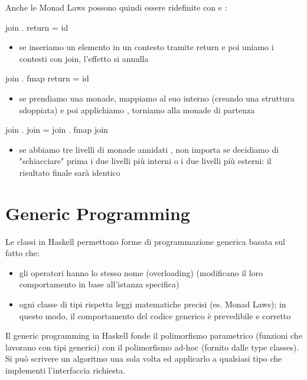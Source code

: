 Anche le Monad Laws possono quindi essere ridefinite con  e :

\begin{haskellbox}{}
join . return = id
\end{haskellbox}
\begin{itemize}
    \item se inseriamo un elemento in un contesto tramite return e poi uniamo i contesti con join, l'effetto si annulla
\end{itemize}

\begin{haskellbox}{}
join . fmap return = id
\end{haskellbox}

\begin{itemize}
    \item se prendiamo una monade, mappiamo  al suo interno (creando una struttura sdoppiata) e poi applichiamo , torniamo alla monade di partenza
\end{itemize}

\begin{haskellbox}{}
join . join = join . fmap join
\end{haskellbox}
\begin{itemize}
    \item se abbiamo tre livelli di monade annidati , non importa se decidiamo di "schiacciare" prima i due livelli più interni o i due livelli più esterni: il risultato finale sarà identico
\end{itemize}

\section{Generic Programming}
Le classi in Haskell permettono forme di programmazione generica basata sul fatto che:
\begin{itemize}
    \item gli operatori hanno lo stesso nome (overloading) (modificano il loro comportamento in base all'istanza specifica)
    \item ogni classe di tipi rispetta leggi matematiche precisi (es. Monad Laws); in questo modo, il comportamento del codice generico è prevedibile e corretto
\end{itemize}

Il generic programming in Haskell fonde il polimorfismo parametrico (funzioni che lavorano con tipi generici) con il polimorfismo ad-hoc (fornito dalle type classes). Si può scrivere un algoritmo una sola volta ed applicarlo a qualsiasi tipo che implementi l'interfaccia richiesta.


